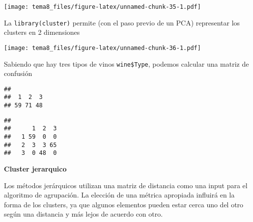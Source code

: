 \documentclass[]{article}
\newenvironment{Shaded}{\begin{snugshade}}{\end{snugshade}}
\newcommand{\KeywordTok}[1]{\textcolor[rgb]{0.13,0.29,0.53}{\textbf{{#1}}}}
\newcommand{\DataTypeTok}[1]{\textcolor[rgb]{0.13,0.29,0.53}{{#1}}}
\newcommand{\DecValTok}[1]{\textcolor[rgb]{0.00,0.00,0.81}{{#1}}}
\newcommand{\StringTok}[1]{\textcolor[rgb]{0.31,0.60,0.02}{{#1}}}
\newcommand{\OtherTok}[1]{\textcolor[rgb]{0.56,0.35,0.01}{{#1}}}
\newcommand{\NormalTok}[1]{{#1}}
\numberwithin{equation}{section}
\begin{document}
\texttt{[image: tema8\_files/figure-latex/unnamed-chunk-35-1.pdf]}

La \texttt{library(cluster)} permite (con el paso previo de un PCA)
representar los clusters en 2 dimensiones

\begin{Shaded}
\end{Shaded}

\texttt{[image: tema8\_files/figure-latex/unnamed-chunk-36-1.pdf]}

Sabiendo que hay tres tipos de vinos \texttt{wine\$Type}, podemos
calcular una matriz de confusión

\begin{Shaded}
\end{Shaded}

\begin{verbatim}
## 
##  1  2  3 
## 59 71 48
\end{verbatim}

\begin{Shaded}
\end{Shaded}

\begin{verbatim}
##    
##      1  2  3
##   1 59  0  0
##   2  3  3 65
##   3  0 48  0
\end{verbatim}

\textbf{Cluster jerarquico}

Los métodos jerárquicos utilizan una matriz de distancia como una input
para el algoritmo de agrupación. La elección de una métrica apropiada
influirá en la forma de los clusters, ya que algunos elementos pueden
estar cerca uno del otro según una distancia y más lejos de acuerdo con
otro.
\end{document}
